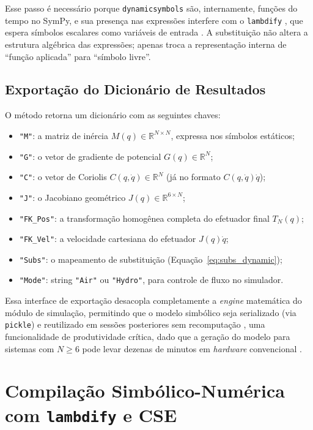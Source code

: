 Esse passo é necessário porque \texttt{dynamicsymbols} são, internamente, funções do tempo no SymPy, e sua presença nas expressões interfere com o \texttt{lambdify} , que espera símbolos escalares como variáveis de entrada \cite{meurer2017sympy}. A substituição não altera a estrutura algébrica das expressões; apenas troca a representação interna de ``função aplicada'' para ``símbolo livre''.

\subsection{Exportação do Dicionário de Resultados}

O método retorna um dicionário com as seguintes chaves:

\begin{itemize}
    \item \texttt{"M"}: a matriz de inércia $M(q) \in \mathbb{R}^{N \times N}$, expressa nos símbolos estáticos;
    \item \texttt{"G"}: o vetor de gradiente de potencial $G(q) \in \mathbb{R}^N$;
    \item \texttt{"C"}: o vetor de Coriolis $C(q,\dot{q}) \in \mathbb{R}^N$ (já no formato $C(q,\dot{q})\dot{q}$);
    \item \texttt{"J"}: o Jacobiano geométrico $J(q) \in \mathbb{R}^{6 \times N}$;
    \item \texttt{"FK\_Pos"}: a transformação homogênea completa do efetuador final $T_N(q)$;
    \item \texttt{"FK\_Vel"}: a velocidade cartesiana do efetuador $J(q)\dot{q}$;
    \item \texttt{"Subs"}: o mapeamento de substituição (Equação~\eqref{eq:subs_dynamic});
    \item \texttt{"Mode"}: string \texttt{"Air"} ou \texttt{"Hydro"}, para controle de fluxo no simulador.
\end{itemize}

Essa interface de exportação desacopla completamente a \textit{engine} matemática do módulo de simulação, permitindo que o modelo simbólico seja serializado (via \texttt{pickle}) e reutilizado em sessões posteriores sem recomputação , uma funcionalidade de produtividade crítica, dado que a geração do modelo para sistemas com $N \geq 6$ pode levar dezenas de minutos em \textit{hardware} convencional \cite{leu1986automated, hollerbach1980recursive}.

\section{Compilação Simbólico-Numérica com \texttt{lambdify} e CSE}
\label{sec:lambdify_cse}


